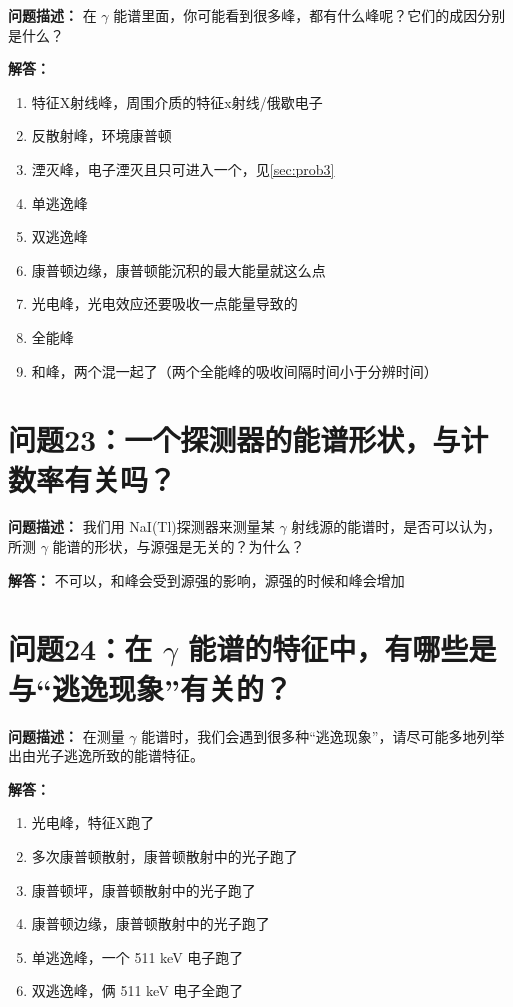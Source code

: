 \documentclass{article}
\begin{document}
\textbf{问题描述：} 在 $\gamma$ 能谱里面，你可能看到很多峰，都有什么峰呢？它们的成因分别是什么？

\textbf{解答：}

\begin{enumerate}
    \item 特征X射线峰，周围介质的特征x射线/俄歇电子
    \item 反散射峰，环境康普顿
    \item 湮灭峰，电子湮灭且只可进入一个，见\ref{sec:prob3}
    \item 单逃逸峰
    \item 双逃逸峰
    \item 康普顿边缘，康普顿能沉积的最大能量就这么点
    \item 光电峰，光电效应还要吸收一点能量导致的
    \item 全能峰
    \item 和峰，两个混一起了（两个全能峰的吸收间隔时间小于分辨时间）
\end{enumerate}

\section{问题23：一个探测器的能谱形状，与计数率有关吗？}
\label{sec:prob23}

\textbf{问题描述：} 我们用 NaI(Tl)探测器来测量某 $\gamma$ 射线源的能谱时，是否可以认为，所测 $\gamma$ 能谱的形状，与源强是无关的？为什么？

\textbf{解答：} 不可以，和峰会受到源强的影响，源强的时候和峰会增加

\section{问题24：在 $\gamma$ 能谱的特征中，有哪些是与“逃逸现象”有关的？}
\label{sec:prob24}

\textbf{问题描述：} 在测量 $\gamma$ 能谱时，我们会遇到很多种“逃逸现象”，请尽可能多地列举出由光子逃逸所致的能谱特征。

\textbf{解答：}

\begin{enumerate}
    \item 光电峰，特征X跑了
    \item 多次康普顿散射，康普顿散射中的光子跑了
    \item 康普顿坪，康普顿散射中的光子跑了
    \item 康普顿边缘，康普顿散射中的光子跑了
    \item 单逃逸峰，一个 511 keV 电子跑了
    \item 双逃逸峰，俩 511 keV 电子全跑了
\end{enumerate}
\end{document}
